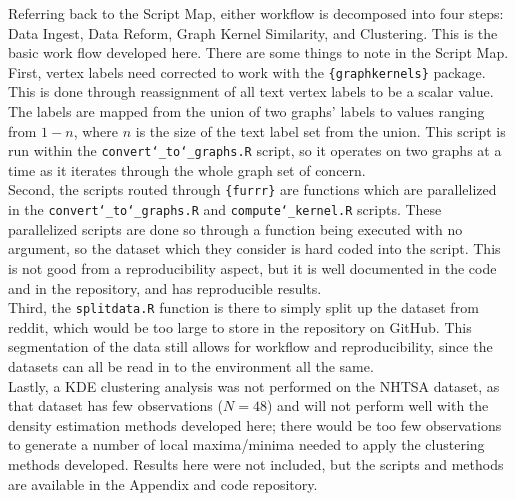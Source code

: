Referring back to the Script Map, either workflow is decomposed into four steps: Data Ingest, Data Reform, Graph Kernel Similarity, and Clustering. This is the basic work flow developed here. There are some things to note in the Script Map.\\ 

First, vertex labels need corrected to work with the \texttt{\{graphkernels\}} package. This is done through reassignment of all text vertex labels to be a scalar value. The labels are mapped from the union of two graphs' labels to values ranging from $1-n$, where $n$ is the size of the text label set from the union. This script is run within the \texttt{convert\char`_to\char`_graphs.R} script, so it operates on two graphs at a time as it iterates through the whole graph set of concern.\\

Second, the scripts routed through \texttt{\{furrr\}} are functions which are parallelized in the \texttt{convert\char`_to\char`_graphs.R} and \texttt{compute\char`_kernel.R} scripts. These parallelized scripts are done so through a function being executed with no argument, so the dataset which they consider is hard coded into the script. This is not good from a reproducibility aspect, but it is well documented in the code and in the repository, and has reproducible results. \\

Third, the \texttt{splitdata.R} function is there to simply split up the dataset from reddit, which would be too large to store in the repository on GitHub. This segmentation of the data still allows for workflow and reproducibility, since the datasets can all be read in to the environment all the same. \\

Lastly, a KDE clustering analysis was not performed on the NHTSA dataset, as that dataset has few observations ($N=48$) and will not perform well with the density estimation methods developed here; there would be too few observations to generate a number of local maxima/minima needed to apply the clustering methods developed. Results here were not included, but the scripts and methods are available in the Appendix and code repository.\\

 